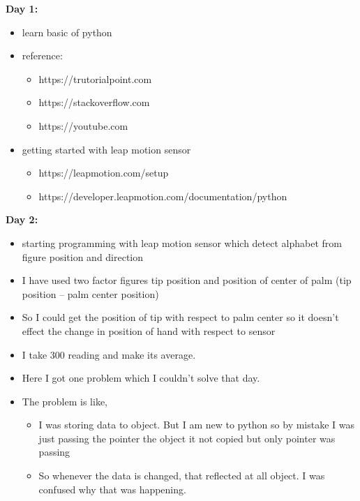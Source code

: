 \documentclass[12pt,a4paper,english]{article}
\begin{document}
		\begin{flushleft}
				\Huge{ \textbf{Day 1:}}
		\end{flushleft}
		\begin{itemize}
			\item learn basic of python
			\item reference:
			 \begin{itemize}
				\item https://trutorialpoint.com
				\item https://stackoverflow.com
				\item https://youtube.com
			\end{itemize}
			\item getting started with leap motion sensor
			\begin{itemize}
				\item https://leapmotion.com/setup
				\item https://developer.leapmotion.com/documentation/python
			\end{itemize}
		\end{itemize}
		\begin{flushleft}
		\Huge{ \textbf{Day 2:}}
		\end{flushleft}
		\begin{itemize}
			\item starting programming with leap motion sensor which detect alphabet from figure position and direction
			\item I have used two factor figures tip position and position of center of palm
			(tip position – palm center position)
			\item So I could get the position of tip with respect to palm center so it doesn’t effect the change in position of hand with respect to sensor
			\item I take 300 reading and make its average.
			\item Here I got one problem which I couldn’t solve that day.
			\item The problem is like,
			\begin{itemize}
				\item I was storing data to object. But I am new to python so by mistake I was just passing the pointer the object it not copied but only pointer was passing
				\item So whenever the data is changed, that reflected at all object. I was confused why that was happening.
			\end{itemize}
		\end{itemize}
\end{document}
